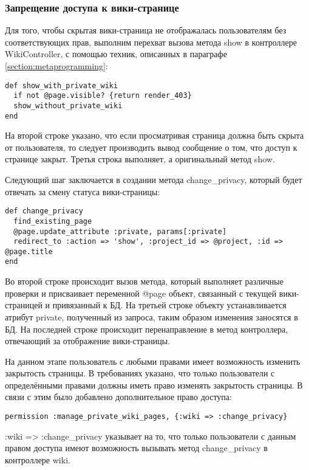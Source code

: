 \subsubsection{Запрещение доступа к вики-странице}
Для того, чтобы скрытая вики-страница не отображалась пользователям без
соответствующих прав, выполним перехват вызова метода show в контроллере
WikiController, с помощью техник, описанных в параграфе
\ref{section:metaprogramming}:
\small{
\begin{lstlisting}
def show_with_private_wiki
  if not @page.visible? {return render_403}
  show_without_private_wiki
end
\end{lstlisting}}
На второй строке указано, что если просматривая страница должна быть скрыта от
пользователя, то следует производить вывод сообщение о том, что доступ к
странице закрыт. Третья строка выполняет, а оригинальный метод show.

Следующий шаг заключается в создании метода change\_privacy, который будет
отвечать за смену статуса вики-страницы:
\small{
\begin{lstlisting}
def change_privacy
  find_existing_page
  @page.update_attribute :private, params[:private]
  redirect_to :action => 'show', :project_id => @project, :id => @page.title
end
\end{lstlisting}}
Во второй строке происходит вызов метода, который выполняет различные проверки
и присваивает переменной @page объект, связанный с текущей вики-страницей и
привязанный к БД. На третьей строке объекту устанавливается атрибут private,
полученный из запроса, таким образом изменения заносятся в БД. На последней
строке происходит перенаправление в метод контроллера, отвечающий за
отображение вики-страницы.

На данном этапе пользователь с любыми правами имеет возможность изменить
закрытость страницы. В требованиях указано, что только пользователи с
определёнными правами должны иметь право изменять закрытость страницы. В связи
с этим было добавлено дополнительное право доступа:
\small{\begin{lstlisting}
permission :manage_private_wiki_pages, {:wiki => :change_privacy}
\end{lstlisting}}
:wiki => :change\_privacy указывает на то, что только пользователи с данным
правом доступа имеют возможность вызывать метод change\_privacy в контроллере
wiki.

